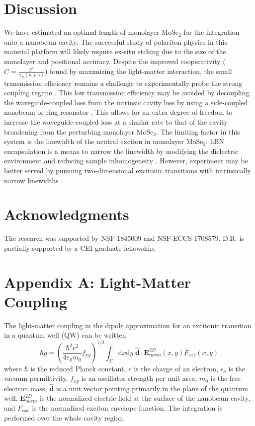 \documentclass{achemso}
\begin{document}
\section{Discussion}
We have estimated an optimal length of monolayer $\mathrm{MoSe}_{2}$ for the integration onto a nanobeam cavity. The successful study of polariton physics in this material platform will likely require ex-situ etching due to the size of the monolayer and positional accuracy. Despite the improved cooperativity ($C=\frac{g^2}{\gamma_{X} (\kappa + \gamma)}$) found by maximizing the light-matter interaction, the small transmission efficiency remains a challenge to experimentally probe the strong coupling regime \cite{rosser_high-precision_2020}. This low transmission efficiency may be avoided by decoupling the waveguide-coupled loss from the intrinsic cavity loss by using a side-coupled nanobeam or ring resonator \cite{xu_scattering-theory_2000, afzal_efficient_2019}. This allows for an extra degree of freedom to increase the waveguide-coupled loss at a similar rate to that of the cavity broadening from the perturbing monolayer $\mathrm{MoSe}_{2}$. The limiting factor in this system is the linewidth of the neutral exciton in monolayer $\mathrm{MoSe}_{2}$. hBN encapsulation is a means to narrow the linewidth by modifying the dielectric environment and reducing sample inhomogeneity \cite{martin_encapsulation_2020}. However, experiment may be better served by pursuing two-dimensional excitonic transitions with intrinsically narrow linewidths \cite{kang_coherent_2020}.

\section*{Acknowledgments}
The research was supported by NSF-1845009 and NSF-ECCS-1708579. D.R. is partially supported by a CEI graduate fellowship.

\section*{Appendix A: Light-Matter Coupling}
\setcounter{equation}{0}
\renewcommand{\theequation}{A\arabic{equation}}

The light-matter coupling in the dipole approximation for an excitonic transition in a quantum well (QW) can be written \cite{andreani_strong-coupling_1999, panzarini_quantum_1999, gerace_quantum_2007}
\begin{equation}\label{rmc_begin}
	\hbar g = \left(\frac{\hbar^2 e^2}{4 \varepsilon_{0} m_{0}} f_{xy}\right)^{1/2} \int_{\Sigma} \mathrm{d}x \mathrm{d}y \; \hat{\mathbf{d}} \cdot \mathbf{E}_{norm}^{2D}(x,y)F_{exc}(x,y)
\end{equation}
where $\hbar$ is the reduced Planck constant,  $e$ is the charge of an electron, $\epsilon_o$ is the vacuum permittivity, $f_{xy}$ is an oscillator strength per unit area, $m_{0}$ is the free electron mass, $\hat{\mathbf{d}}$ is a unit vector pointing primarily in the plane of the quantum well, $\mathbf{E}_{norm}^{2D}$ is the normalized electric field at the surface of the nanobeam cavity, and $F_{exc}$ is the normalized exciton envelope function. The integration is performed over the whole cavity region.
\end{document}
